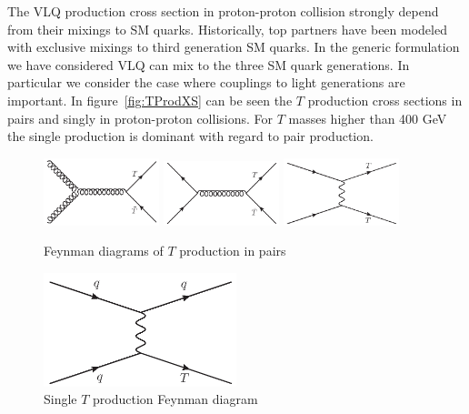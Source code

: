 The VLQ production cross section in proton-proton collision strongly depend from their mixings to SM quarks. Historically, top partners have been modeled with exclusive mixings to third generation SM quarks. In the generic formulation we have considered VLQ can mix to the three SM quark generations. In particular we consider the case where couplings to light generations are important. In figure~\ref{fig:TProdXS} can be seen the $T$ production cross sections in pairs and singly in proton-proton collisions. For $T$ masses higher than 400 GeV the single production is dominant with regard to pair production. 

\begin{figure}[!Hhtbp]
  \begin{center}
    \includegraphics[width=0.3\textwidth]{figs/Gluon_fusion_T_pair.jpg}
    \includegraphics[width=0.3\textwidth]{figs/Quarks_schannel_T_pair.jpg}
    \includegraphics[width=0.3\textwidth]{figs/Gluon_tchannel_T_pair.jpg}
    \caption{Feynman diagrams of $T$ production in pairs}
    \label{fig:ProdDiagPair}
  \end{center}
\end{figure}

\begin{figure}[!Hhtbp]
  \begin{center}
    \includegraphics[width=0.5\textwidth]{figs/Tchannel_T_single.jpg}
    \caption{Single $T$ production Feynman diagram}
    \label{fig:ProdDiagSingle}
  \end{center}
\end{figure}

